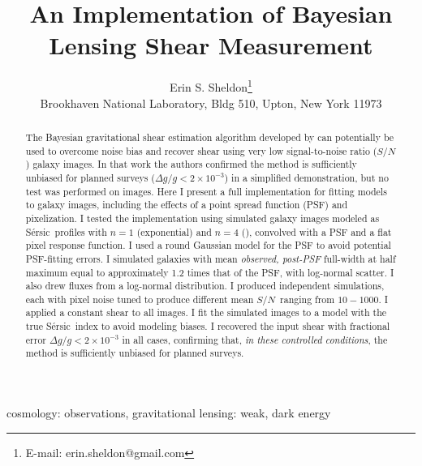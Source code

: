 \documentclass[usegraphicx,usenatbib]{mn2e}
\title{An Implementation of Bayesian Lensing Shear Measurement}
\author[Erin S. Sheldon]{Erin S. Sheldon\thanks{E-mail: erin.sheldon@gmail.com}\\
Brookhaven National Laboratory, Bldg 510, Upton, New York 11973}
\newcommand{\sn}{$S/N$}
\newcommand{\sersic}{S\'{e}rsic}
\begin{document}
\maketitle

\begin{abstract}

The Bayesian gravitational shear estimation algorithm developed by \cite{ba14}
can potentially be used to overcome noise bias and recover shear using very low
signal-to-noise ratio (\sn) galaxy images.  In that work the authors confirmed
the method is sufficiently unbiased for planned surveys ($\Delta g/g < 2 \times
10^{-3}$) in a simplified demonstration, but no test was performed on images.
Here I present a full implementation for fitting models to galaxy images,
including the effects of a point spread function (PSF) and pixelization.  I
tested the implementation using simulated galaxy images modeled as \sersic\
profiles with $n=1$ (exponential) and $n=4$ (\devauc), convolved with a PSF and
a flat pixel response function.  I used a round Gaussian model for the PSF to
avoid potential PSF-fitting errors. I simulated galaxies with mean {\em
observed, post-PSF} full-width at half maximum equal to approximately 1.2 times
that of the PSF, with log-normal scatter.  I also drew fluxes from a log-normal
distribution. I produced independent simulations, each with pixel noise tuned
to produce different mean \sn\ ranging from $10-1000$.  I applied a constant
shear to all images.  I fit the simulated images to a model with the true
\sersic\ index to avoid modeling biases.  I recovered the input shear with
fractional error $\Delta g/g < 2 \times 10^{-3}$ in all cases, confirming that,
{\em in these controlled conditions}, the method is sufficiently unbiased for
planned surveys.





\end{abstract}


\begin{keywords}                                                                    
    cosmology: observations,
    gravitational lensing: weak,
    dark energy
\end{keywords} 
\end{document}
